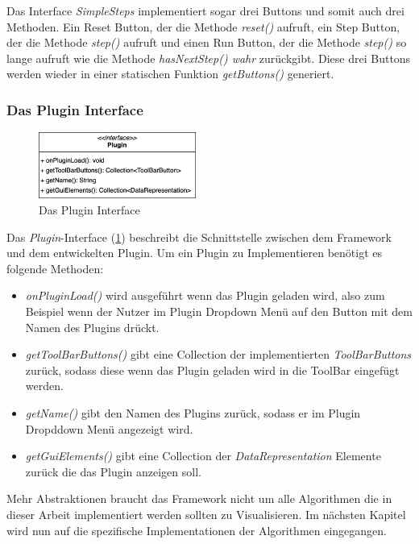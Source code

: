 Das Interface \textit{SimpleSteps} implementiert sogar drei Buttons und somit auch
drei Methoden. Ein Reset Button, der die Methode \textit{reset()} aufruft, ein Step
Button, der die Methode \textit{step()} aufruft und einen Run Button, der die Methode
\textit{step()} so lange aufruft wie die Methode \textit{hasNextStep() wahr} zurückgibt.
Diese drei Buttons werden wieder in einer statischen Funktion \textit{getButtons()}
generiert.\\


\newpage
\subsubsection{Das Plugin Interface}
\begin{figure}
  \centering
  \vspace{-20pt}
  \includegraphics[width=0.46\textwidth]{fig/Plugin_methods.png}
  \caption{Das Plugin Interface}
  \label{fig:PluginInterface}
  \vspace{-20pt}
\end{figure}

Das \textit{Plugin}-Interface (\cref{fig:PluginInterface}) beschreibt die
Schnittstelle zwischen dem Framework und dem entwickelten Plugin.
Um ein Plugin zu Implementieren benötigt es folgende Methoden:
\vspace{30pt}

\begin{itemize}
  \item \textit{onPluginLoad()} wird ausgeführt wenn das Plugin geladen wird, also zum 
    Beispiel wenn der Nutzer im Plugin Dropdown Menü auf den Button mit dem Namen des
    Plugins drückt.
  \item \textit{getToolBarButtons()} gibt eine Collection der implementierten \textit{ToolBarButtons}
    zurück, sodass diese wenn das Plugin geladen wird in die ToolBar eingefügt werden.
  \item \textit{getName()} gibt den Namen des Plugins zurück, sodass er im Plugin Dropddown Menü
    angezeigt wird.
  \item \textit{getGuiElements()} gibt eine Collection der \textit{DataRepresentation} Elemente
    zurück die das Plugin anzeigen soll.
\end{itemize}
Mehr Abstraktionen braucht das Framework nicht um alle Algorithmen die in dieser
Arbeit implementiert werden sollten zu Visualisieren.
Im nächsten Kapitel wird nun auf die spezifische Implementationen der Algorithmen eingegangen.

